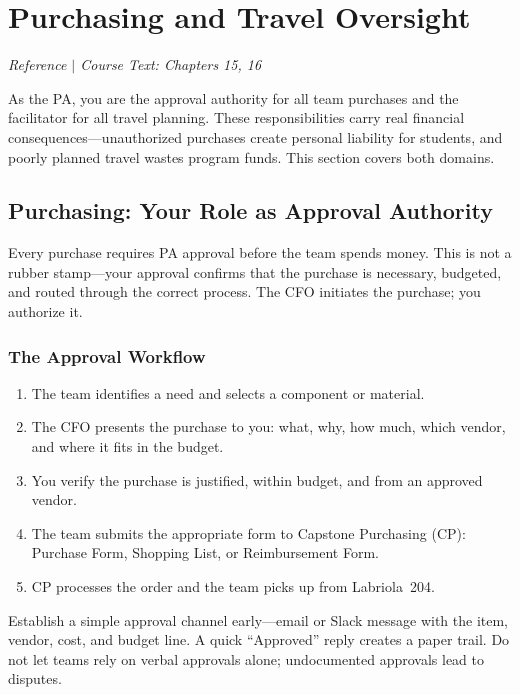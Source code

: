 \section{Purchasing and Travel Oversight}
\textit{Reference $|$ Course Text: Chapters 15, 16}

As the PA, you are the approval authority for all team purchases and the facilitator for all travel planning. These responsibilities carry real financial consequences---unauthorized purchases create personal liability for students, and poorly planned travel wastes program funds. This section covers both domains.


\subsection{Purchasing: Your Role as Approval Authority}

Every purchase requires PA approval before the team spends money. This is not a rubber stamp---your approval confirms that the purchase is necessary, budgeted, and routed through the correct process. The CFO initiates the purchase; you authorize it.

\subsubsection{The Approval Workflow}

\begin{enumerate}[nosep,leftmargin=1.5em]
\item The team identifies a need and selects a component or material.
\item The CFO presents the purchase to you: what, why, how much, which vendor, and where it fits in the budget.
\item You verify the purchase is justified, within budget, and from an approved vendor.
\item The team submits the appropriate form to Capstone Purchasing (CP): Purchase Form, Shopping List, or Reimbursement Form.
\item CP processes the order and the team picks up from Labriola~204.
\end{enumerate}

\begin{bestpractice}
Establish a simple approval channel early---email or Slack message with the item, vendor, cost, and budget line. A quick ``Approved'' reply creates a paper trail. Do not let teams rely on verbal approvals alone; undocumented approvals lead to disputes.
\end{bestpractice}

